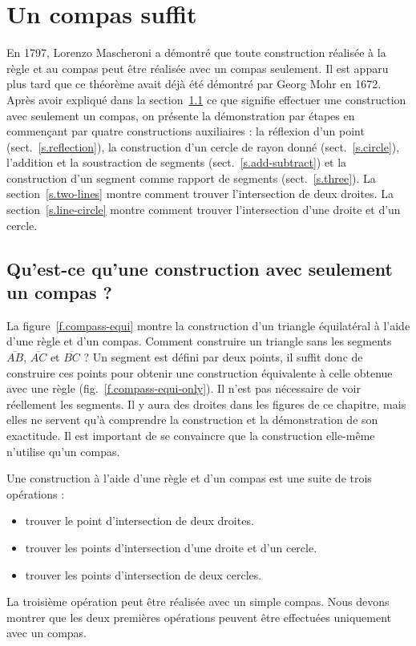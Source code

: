 \chapter{Un compas suffit}\label{c.compass}




En 1797, Lorenzo Mascheroni a démontré que toute construction réalisée à la règle et au  compas peut être réalisée avec un compas seulement. Il est apparu plus tard que ce théorème avait déjà été démontré par Georg Mohr en 1672. 
Après avoir expliqué dans la section~\ref{s.compass-what} ce que signifie effectuer une construction avec seulement un compas, on présente la démonstration par étapes en commençant par quatre constructions auxiliaires : la réflexion d'un point (sect.~\ref{s.reflection}), la construction d'un cercle de rayon donné (sect.~\ref{s.circle}), l'addition et la soustraction de segments  (sect.~\ref{s.add-subtract}) et la construction d'un segment  comme rapport de segments (sect.~\ref{s.three}). La section~\ref{s.two-lines} montre comment trouver l'intersection de deux droites. La section~\ref{s.line-circle} montre comment trouver l'intersection d'une droite et d'un cercle.

\section{Qu'est-ce qu'une construction avec seulement un compas ?}\label{s.compass-what}

La figure~\ref{f.compass-equi} montre la construction d'un triangle équilatéral à l'aide d'une règle et d'un compas. Comment construire un triangle sans les segments  $\overline{AB}$, $\overline{AC}$ et $\overline{BC}$ ? Un segment  est défini par deux points, il suffit donc de construire ces points pour obtenir une construction équivalente à celle obtenue avec une règle (fig.~\ref{f.compass-equi-only}). Il n'est pas nécessaire de voir réellement les segments.
Il y aura des droites dans les figures de ce chapitre, mais elles ne servent qu'à comprendre la construction et la démonstration  de son exactitude. Il est important de se convaincre que la construction elle-même n'utilise qu'un compas.


Une construction à l'aide d'une règle et d'un compas est une suite de trois opérations :
\begin{itemize}
\item trouver le point d'intersection de deux droites.
\item trouver les points d'intersection d'une droite et d'un cercle.
\item trouver les points d'intersection de deux cercles.
\end{itemize}
La troisième opération peut être réalisée avec un simple compas. Nous devons montrer que les deux premières opérations peuvent être effectuées uniquement avec un compas. 

